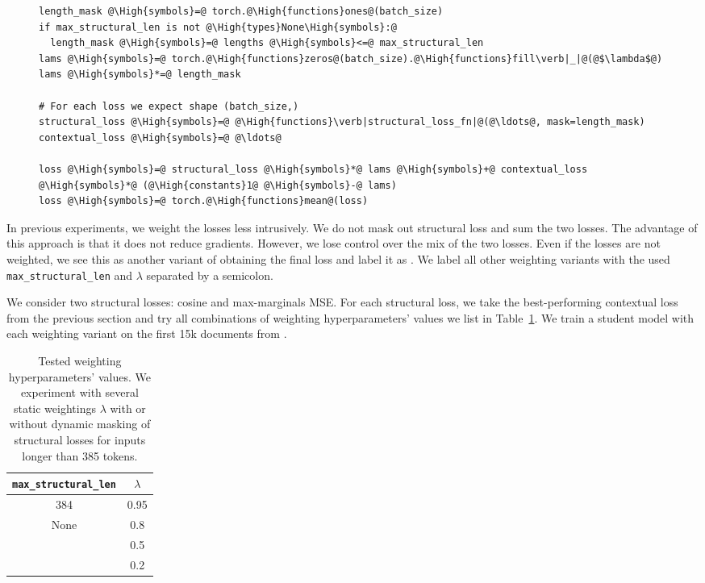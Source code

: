 \begin{figure}
\begin{lstlisting}[caption=Python-like pseudocode of weighting algorithm.,label={lst:weighting}]
length_mask @\High{symbols}=@ torch.@\High{functions}ones@(batch_size)
if max_structural_len is not @\High{types}None\High{symbols}:@
  length_mask @\High{symbols}=@ lengths @\High{symbols}<=@ max_structural_len
lams @\High{symbols}=@ torch.@\High{functions}zeros@(batch_size).@\High{functions}fill\verb|_|@(@$\lambda$@)
lams @\High{symbols}*=@ length_mask

# For each loss we expect shape (batch_size,)
structural_loss @\High{symbols}=@ @\High{functions}\verb|structural_loss_fn|@(@\ldots@, mask=length_mask)
contextual_loss @\High{symbols}=@ @\ldots@

loss @\High{symbols}=@ structural_loss @\High{symbols}*@ lams @\High{symbols}+@ contextual_loss @\High{symbols}*@ (@\High{constants}1@ @\High{symbols}-@ lams)
loss @\High{symbols}=@ torch.@\High{functions}mean@(loss)
\end{lstlisting}
\end{figure}

In previous experiments, we weight the losses less intrusively. We do not
mask out structural loss and sum the two losses. The advantage
of this approach is that it does not reduce gradients. However, we
lose control over the mix of the two losses. Even if the losses are not
weighted, we see this as another variant of obtaining the final loss and label
it as . We label all other weighting variants with the used
\texttt{max\_structural\_len} and $\lambda$ separated by a semicolon.

We consider two structural losses: cosine and max-marginals MSE. For each
structural loss, we take the best-performing contextual loss from the previous
section and try all combinations of weighting hyperparameters' values we list
in Table~\ref{table:weighting_variants}. We train a student model with each
weighting variant on the first 15k documents from .

\begin{table}
  \centering
  \footnotesize
  \begin{tabular}{cc}
    \toprule
    \texttt{max\_structural\_len} & $\lambda$ \\
    \midrule
    384 & 0.95 \\
    None & 0.8 \\
    & 0.5 \\
    & 0.2 \\
    \bottomrule
  \end{tabular}

  \caption{Tested weighting hyperparameters' values. We experiment with several
  static weightings $\lambda$ with or without dynamic masking of structural
  losses for inputs longer than 385 tokens.}

  \label{table:weighting_variants}

\end{table}

